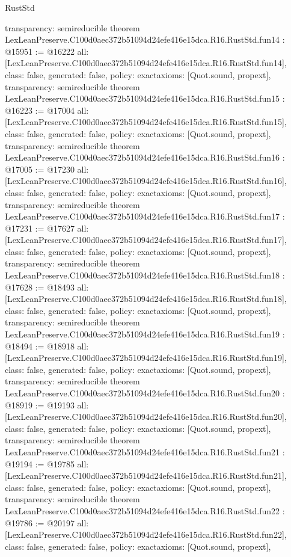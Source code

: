 \begin{lexlean}{RustStd}
\begin{coremodule}
{  transparency: semireducible
}
theorem LexLeanPreserve.C100d0aec372b51094d24efe416e15dca.R16.RustStd.fun14 : @15951 := @16222 {
  all: [LexLeanPreserve.C100d0aec372b51094d24efe416e15dca.R16.RustStd.fun14],
  class: false,
  generated: false,
  policy: exact{axioms: [Quot.sound, propext]},
  transparency: semireducible
}
theorem LexLeanPreserve.C100d0aec372b51094d24efe416e15dca.R16.RustStd.fun15 : @16223 := @17004 {
  all: [LexLeanPreserve.C100d0aec372b51094d24efe416e15dca.R16.RustStd.fun15],
  class: false,
  generated: false,
  policy: exact{axioms: [Quot.sound, propext]},
  transparency: semireducible
}
theorem LexLeanPreserve.C100d0aec372b51094d24efe416e15dca.R16.RustStd.fun16 : @17005 := @17230 {
  all: [LexLeanPreserve.C100d0aec372b51094d24efe416e15dca.R16.RustStd.fun16],
  class: false,
  generated: false,
  policy: exact{axioms: [Quot.sound, propext]},
  transparency: semireducible
}
theorem LexLeanPreserve.C100d0aec372b51094d24efe416e15dca.R16.RustStd.fun17 : @17231 := @17627 {
  all: [LexLeanPreserve.C100d0aec372b51094d24efe416e15dca.R16.RustStd.fun17],
  class: false,
  generated: false,
  policy: exact{axioms: [Quot.sound, propext]},
  transparency: semireducible
}
theorem LexLeanPreserve.C100d0aec372b51094d24efe416e15dca.R16.RustStd.fun18 : @17628 := @18493 {
  all: [LexLeanPreserve.C100d0aec372b51094d24efe416e15dca.R16.RustStd.fun18],
  class: false,
  generated: false,
  policy: exact{axioms: [Quot.sound, propext]},
  transparency: semireducible
}
theorem LexLeanPreserve.C100d0aec372b51094d24efe416e15dca.R16.RustStd.fun19 : @18494 := @18918 {
  all: [LexLeanPreserve.C100d0aec372b51094d24efe416e15dca.R16.RustStd.fun19],
  class: false,
  generated: false,
  policy: exact{axioms: [Quot.sound, propext]},
  transparency: semireducible
}
theorem LexLeanPreserve.C100d0aec372b51094d24efe416e15dca.R16.RustStd.fun20 : @18919 := @19193 {
  all: [LexLeanPreserve.C100d0aec372b51094d24efe416e15dca.R16.RustStd.fun20],
  class: false,
  generated: false,
  policy: exact{axioms: [Quot.sound, propext]},
  transparency: semireducible
}
theorem LexLeanPreserve.C100d0aec372b51094d24efe416e15dca.R16.RustStd.fun21 : @19194 := @19785 {
  all: [LexLeanPreserve.C100d0aec372b51094d24efe416e15dca.R16.RustStd.fun21],
  class: false,
  generated: false,
  policy: exact{axioms: [Quot.sound, propext]},
  transparency: semireducible
}
theorem LexLeanPreserve.C100d0aec372b51094d24efe416e15dca.R16.RustStd.fun22 : @19786 := @20197 {
  all: [LexLeanPreserve.C100d0aec372b51094d24efe416e15dca.R16.RustStd.fun22],
  class: false,
  generated: false,
  policy: exact{axioms: [Quot.sound, propext]},
}
\end{coremodule}
\end{lexlean}

